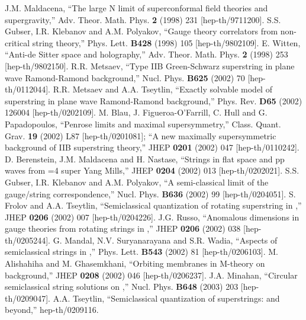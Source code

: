 \documentclass[12pt,a4paper]{article}
\begin{document}
\begin{thebibliography}{99}
 J.M. Maldacena, ``The large N limit of superconformal
field theories and supergravity,'' Adv. Theor. Math. Phys. \textbf{2}
(1998) 231 [hep-th/9711200].
 S.S. Gubser, I.R. Klebanov and A.M. Polyakov, 
``Gauge theory correlators from non-critical string theory,''
Phys. Lett. \textbf{B428} (1998) 105 [hep-th/9802109].
 E. Witten, ``Anti-de Sitter space and holography,''
Adv. Theor. Math. Phys. \textbf{2} (1998) 253 [hep-th/9802150].
 R.R. Metsaev, ``Type IIB Green-Schwarz superstring in
plane wave Ramond-Ramond background,'' Nucl. Phys. \textbf{B625}
(2002) 70 [hep-th/0112044].
 R.R. Metsaev and A.A. Tseytlin, ``Exactly solvable 
model of superstring in plane wave Ramond-Ramond background,'' Phys.
Rev. \textbf{D65} (2002) 126004 [hep-th/0202109].
 M. Blau, J. Figueroa-O'Farrill, C. Hull and G. Papadopoulos,
``Penrose limits and maximal supersymmetry,'' Class. Quant. Grav.
\textbf{19} (2002) L87 [hep-th/0201081]; ``A new maximally 
supersymmetric background of IIB superstring theory,'' JHEP \textbf{0201}
(2002) 047 [hep-th/0110242].
 D. Berenstein, J.M. Maldacena and H. Nastase, 
``Strings in flat space and pp waves from \coordHE{}=4 super
Yang Mills,'' JHEP \textbf{0204} (2002) 013 [hep-th/0202021].
 S.S. Gubser, I.R. Klebanov and A.M. Polyakov,
``A semi-classical limit of the gauge/string correspondence,''
Nucl. Phys. \textbf{B636} (2002) 99 [hep-th/0204051].
 S. Frolov and A.A. Tseytlin, ``Semiclassical 
quantization of rotating superstring in \coordHE{},'' JHEP
\textbf{0206} (2002) 007 [hep-th/0204226].
 J.G. Russo, ``Anomalous dimensions in gauge theories
from rotating strings in \coordHE{},'' JHEP \textbf{0206} (2002)
038 [hep-th/0205244].
 G. Mandal, N.V. Suryanarayana and S.R. Wadia, 
``Aspects of semiclassical strings in \coordHE{},'' 
Phys. Lett. \textbf{B543} (2002) 81 [hep-th/0206103].
 M. Alishahiha and M. Ghasemkhani, ``Orbiting membranes
in M-theory on \coordHE{} background,'' JHEP \textbf{0208} 
(2002) 046 [hep-th/0206237].
 J.A. Minahan, ``Circular semiclassical string solutions
on \coordHE{},'' Nucl. Phys. \textbf{B648}
(2003) 203 [hep-th/0209047].
 A.A. Tseytlin, ``Semiclassical quantization of 
superstrings: \coordHE{} and beyond,'' hep-th/0209116.

\end{thebibliography}
\end{document}
